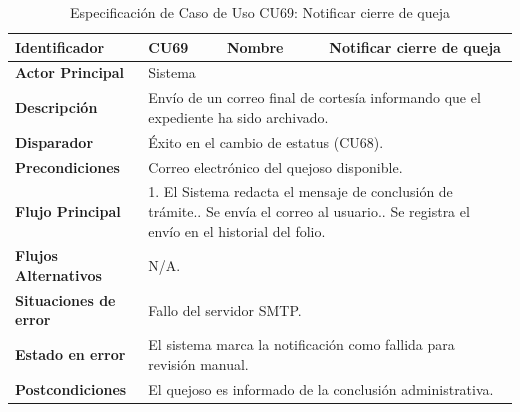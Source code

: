 \begingroup
\setlength{\parskip}{0pt}
\begin{longtable}{|p{3.5cm}|p{2cm}|p{2.5cm}|p{7cm}|}
\caption{Especificación de Caso de Uso CU69: Notificar cierre de queja}
\label{tab:cu69} \\
\hline
\textbf{Identificador} & CU69 & \textbf{Nombre} & Notificar cierre de queja \\ \hline
\textbf{Actor Principal} & \multicolumn{3}{p{11.5cm}|}{Sistema} \\ \hline
\textbf{Descripción} & \multicolumn{3}{p{11.5cm}|}{Envío de un correo final de cortesía informando que el expediente ha sido archivado.} \\ \hline
\textbf{Disparador} & \multicolumn{3}{p{11.5cm}|}{Éxito en el cambio de estatus (CU68).} \\ \hline
\textbf{Precondiciones} & \multicolumn{3}{p{11.5cm}|}{Correo electrónico del quejoso disponible.} \\ \hline
\textbf{Flujo Principal} & \multicolumn{3}{p{11.5cm}|}{1. El Sistema redacta el mensaje de conclusión de trámite.\newline 2. Se envía el correo al usuario.\newline 3. Se registra el envío en el historial del folio.} \\ \hline
\textbf{Flujos Alternativos} & \multicolumn{3}{p{11.5cm}|}{N/A.} \\ \hline
\textbf{Situaciones de error} & \multicolumn{3}{p{11.5cm}|}{Fallo del servidor SMTP.} \\ \hline
\textbf{Estado en error} & \multicolumn{3}{p{11.5cm}|}{El sistema marca la notificación como fallida para revisión manual.} \\ \hline
\textbf{Postcondiciones} & \multicolumn{3}{p{11.5cm}|}{El quejoso es informado de la conclusión administrativa.} \\ \hline
\end{longtable}
\endgroup